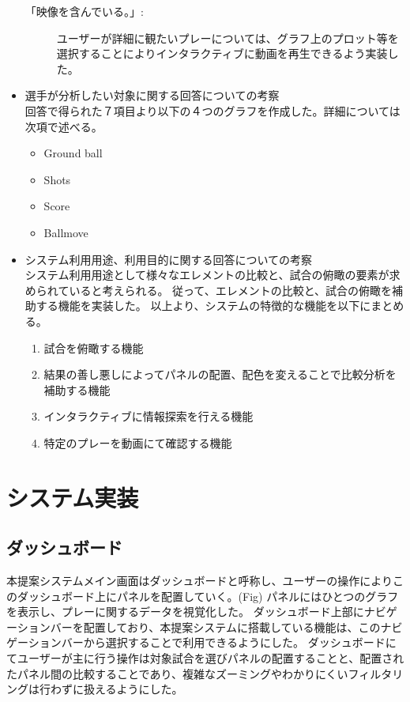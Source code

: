 \documentclass[sotsuron]{kuee}
\begin{document}
\begin{itemize}
\begin{description}
							\item [「映像を含んでいる。」:]
							ユーザーが詳細に観たいプレーについては、グラフ上のプロット等を選択することによりインタラクティブに動画を再生できるよう実装した。
						\end{description}
					\item 選手が分析したい対象に関する回答についての考察
						\\回答で得られた７項目より以下の４つのグラフを作成した。詳細については次項で述べる。
							\begin{itemize}
								\item Ground ball
								\item Shots
								\item Score
								\item Ballmove
							\end{itemize}
					\item システム利用用途、利用目的に関する回答についての考察
						\\システム利用用途として様々なエレメントの比較と、試合の俯瞰の要素が求められていると考えられる。
						従って、エレメントの比較と、試合の俯瞰を補助する機能を実装した。
						以上より、システムの特徴的な機能を以下にまとめる。
						\begin{enumerate}	
							\item 試合を俯瞰する機能
							\item 結果の善し悪しによってパネルの配置、配色を変えることで比較分析を補助する機能
							\item インタラクティブに情報探索を行える機能
							\item 特定のプレーを動画にて確認する機能
						\end{enumerate}
				\end{itemize}
	\section{システム実装}
		\subsection{ダッシュボード}
			本提案システムメイン画面はダッシュボードと呼称し、ユーザーの操作によりこのダッシュボード上にパネルを配置していく。(Fig)
			パネルにはひとつのグラフを表示し、プレーに関するデータを視覚化した。
			ダッシュボード上部にナビゲーションバーを配置しており、本提案システムに搭載している機能は、このナビゲーションバーから選択することで利用できるようにした。
			ダッシュボードにてユーザーが主に行う操作は対象試合を選びパネルの配置することと、配置されたパネル間の比較することであり、複雑なズーミングやわかりにくいフィルタリングは行わずに扱えるようにした。
\end{document}
